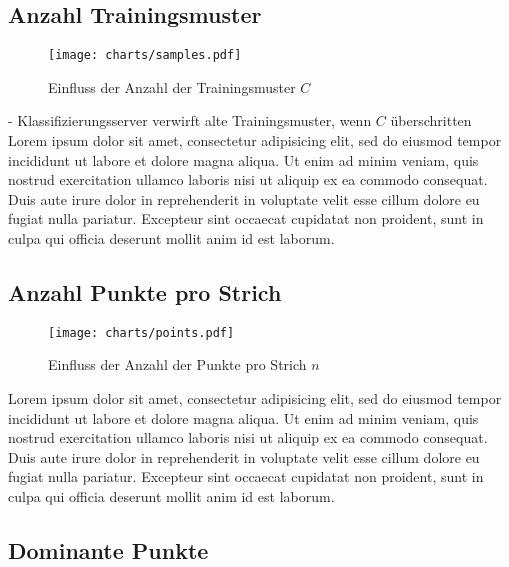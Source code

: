 \subsection{Anzahl Trainingsmuster} %
\label{sub:anzahl_trainingsmuster}

\begin{figure}[htbp]
  \begin{center}
    \texttt{[image: charts/samples.pdf]}
  \end{center}
  \caption{Einfluss der Anzahl der Trainingsmuster $C$}
  \label{chart:samples}
\end{figure}

- Klassifizierungsserver verwirft alte Trainingsmuster, wenn $C$ überschritten
Lorem ipsum dolor sit amet, consectetur adipisicing elit, sed do eiusmod tempor incididunt ut labore et dolore magna aliqua. Ut enim ad minim veniam, quis nostrud exercitation ullamco laboris nisi ut aliquip ex ea commodo consequat. Duis aute irure dolor in reprehenderit in voluptate velit esse cillum dolore eu fugiat nulla pariatur. Excepteur sint occaecat cupidatat non proident, sunt in culpa qui officia deserunt mollit anim id est laborum.

\subsection{Anzahl Punkte pro Strich} %
\label{sub:anzahl_punkte_pro_strich}

\begin{figure}[htbp]
  \begin{center}
    \texttt{[image: charts/points.pdf]}
  \end{center}
  \caption{Einfluss der Anzahl der Punkte pro Strich $n$}
  \label{chart:points}
\end{figure}

Lorem ipsum dolor sit amet, consectetur adipisicing elit, sed do eiusmod tempor incididunt ut labore et dolore magna aliqua. Ut enim ad minim veniam, quis nostrud exercitation ullamco laboris nisi ut aliquip ex ea commodo consequat. Duis aute irure dolor in reprehenderit in voluptate velit esse cillum dolore eu fugiat nulla pariatur. Excepteur sint occaecat cupidatat non proident, sunt in culpa qui officia deserunt mollit anim id est laborum.

\subsection{Dominante Punkte} %
\label{sub:dominante_punkte}

